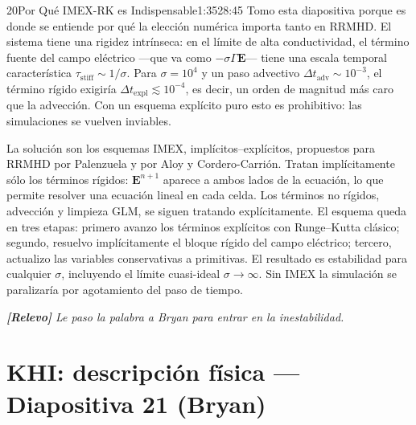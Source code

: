 \documentclass[11pt,a4paper]{article}
\newcommand{\relevo}[1]{%
  \par\medskip
  \noindent\colorbox{tagbg}{\parbox{\dimexpr\linewidth-2\fboxsep\relax}{%
    \small\itshape \textbf{[Relevo]} #1}}\par\medskip}
\begin{document}
\begin{seborador}{20}{Por Qué IMEX-RK es Indispensable}{1:35}{28:45}
Tomo esta diapositiva porque es donde se entiende por qué la elección
numérica importa tanto en RRMHD. El sistema tiene una rigidez intrínseca: en
el límite de alta conductividad, el término fuente del campo eléctrico ---que
va como $-\sigma\Gamma\mathbf{E}$--- tiene una escala temporal característica
$\tau_\text{stiff}\sim 1/\sigma$. Para $\sigma=10^4$ y un paso advectivo
$\Delta t_\text{adv}\sim 10^{-3}$, el término rígido exigiría $\Delta
t_\text{expl}\lesssim 10^{-4}$, es decir, un orden de magnitud más caro que
la advección. Con un esquema explícito puro esto es prohibitivo: las
simulaciones se vuelven inviables.

La solución son los esquemas IMEX, implícitos--explícitos, propuestos para
RRMHD por Palenzuela y por Aloy y Cordero-Carrión. Tratan implícitamente sólo
los términos rígidos: $\mathbf{E}^{n+1}$ aparece a ambos lados de la
ecuación, lo que permite resolver una ecuación lineal en cada celda. Los
términos no rígidos, advección y limpieza GLM, se siguen tratando
explícitamente. El esquema queda en tres etapas: primero avanzo los términos
explícitos con Runge--Kutta clásico; segundo, resuelvo implícitamente el
bloque rígido del campo eléctrico; tercero, actualizo las variables
conservativas a primitivas. El resultado es estabilidad para cualquier
$\sigma$, incluyendo el límite cuasi-ideal $\sigma\to\infty$. Sin IMEX la
simulación se paralizaría por agotamiento del paso de tiempo.
\relevo{Le paso la palabra a Bryan para entrar en la inestabilidad.}
\end{seborador}

\section{KHI: descripción física --- Diapositiva 21 (Bryan)}
\end{document}
